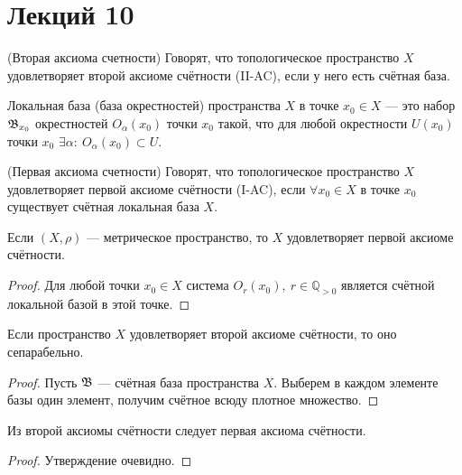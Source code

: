 \section{Лекций 10}

\begin{definition}
    (Вторая аксиома счетности) Говорят, что топологическое пространство $X$ удовлетворяет второй аксиоме счётности (II-AC), если у него есть счётная база.
\end{definition}

\begin{definition}
    Локальная база (база окрестностей) пространства $X$ в точке $x_0 \in X$ --- это набор $\mathfrak{B}_{x_0}$ окрестностей $O_\alpha(x_0)$ точки $x_0$ такой, что для любой окрестности $U(x_0)$ точки $x_0$ $\exists \alpha: \ O_\alpha(x_0) \subset U$.
\end{definition}

\begin{definition}
    (Первая аксиома счетности) Говорят, что топологическое пространство $X$ удовлетворяет первой аксиоме счётности (I-AC), если $\forall x_0 \in X$ в точке $x_0$ существует счётная локальная база $X$.
\end{definition}

\begin{statement}
    Если $(X, \rho)$ --- метрическое пространство, то $X$ удовлетворяет первой аксиоме счётности. 
\end{statement}
\begin{proof}
    Для любой точки $x_0 \in X$ система $O_r(x_0),\ r \in \mathbb{Q}_{>0}$ является счётной локальной базой в этой точке. 
\end{proof}

\begin{statement}
    Если пространство $X$ удовлетворяет второй аксиоме счётности, то оно сепарабельно.
\end{statement}
\begin{proof}
    Пусть $\mathfrak{B}$ --- счётная база пространства $X$. Выберем в каждом элементе базы один элемент, получим счётное всюду плотное множество. 
\end{proof}

\begin{statement}
    Из второй аксиомы счётности следует первая аксиома счётности.
\end{statement}
\begin{proof}
    Утверждение очевидно.
\end{proof}

